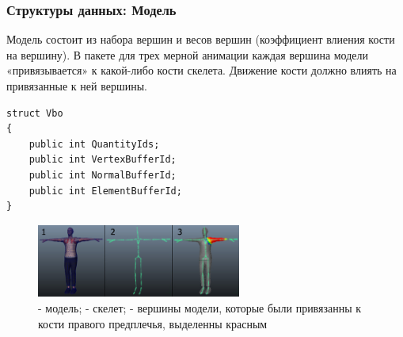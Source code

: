 \documentclass{beamer}
\begin{document}
  
\begin{frame}[fragile]
\frametitle{Структуры данных: Модель}
\begin{scriptsize}

\begin{multicols}{2}
Модель состоит из набора вершин и весов вершин (коэффициент влиения кости на вершину). В пакете для трех мерной анимации каждая вершина модели «привязывается» к какой-либо кости скелета. Движение кости должно влиять на привязанные к ней вершины.

\columnbreak

\begin{verbatim}
struct Vbo
{
    public int QuantityIds;    
    public int VertexBufferId;
    public int NormalBufferId;
    public int ElementBufferId;
}
\end{verbatim}

\end{multicols}

\begin{figure}[h!]
    \centering
    \includegraphics[width=0.6\textwidth]{skinning.png}
    \caption{\scriptsize{ - модель;  - скелет;  - вершины модели, которые были привязанны к кости правого предплечья, выделенны красным}}
\end{figure}

\end{scriptsize}
\end{frame}
\end{document}
